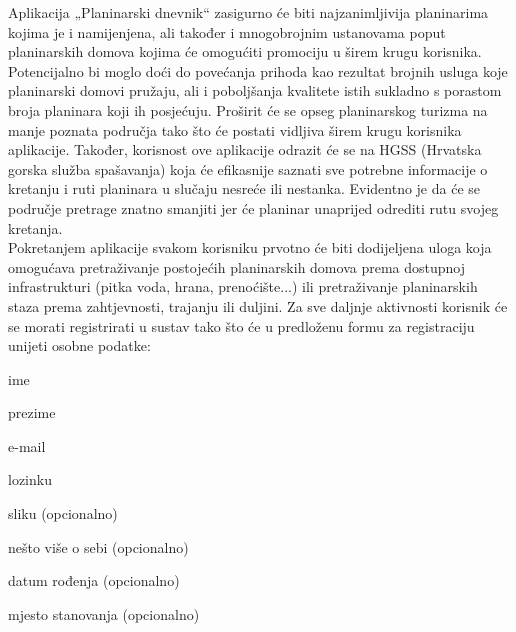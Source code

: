 		Aplikacija „Planinarski dnevnik“ zasigurno će biti najzanimljivija planinarima kojima je i namijenjena, ali također i mnogobrojnim ustanovama poput planinarskih domova kojima će omogućiti promociju u širem krugu korisnika. Potencijalno bi moglo doći do povećanja prihoda kao rezultat brojnih usluga koje planinarski domovi pružaju, ali i poboljšanja kvalitete istih sukladno s porastom broja planinara koji ih posjećuju. Proširit će se opseg planinarskog turizma na manje poznata područja tako što će postati vidljiva širem krugu korisnika aplikacije. Također, korisnost ove aplikacije odrazit će se na HGSS (Hrvatska gorska služba spašavanja) koja će efikasnije saznati sve potrebne informacije o kretanju i ruti planinara u slučaju nesreće ili nestanka. Evidentno je da će se područje pretrage znatno smanjiti jer će planinar unaprijed odrediti rutu svojeg kretanja.\\
		
		Pokretanjem aplikacije svakom korisniku prvotno će biti dodijeljena uloga  koja omogućava pretraživanje postojećih planinarskih domova prema dostupnoj infrastrukturi (pitka voda, hrana, prenoćište...) ili
		pretraživanje planinarskih staza prema zahtjevnosti, trajanju ili duljini. Za sve daljnje aktivnosti korisnik će se morati registrirati u sustav tako što će u predloženu formu za registraciju unijeti osobne podatke:
		\begin{packed_item}
			\item ime
			\item prezime
			\item e-mail
			\item lozinku
			\item sliku (opcionalno)
			\item nešto više o sebi (opcionalno)
			\item datum rođenja (opcionalno)
			\item mjesto stanovanja (opcionalno)	
		\end{packed_item}
	 
